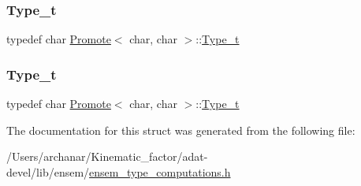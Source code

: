 \subsubsection{\texorpdfstring{Type\_t}{Type\_t}\hspace{0.1cm}{\footnotesize\ttfamily [2/3]}}
{\footnotesize\ttfamily typedef char \mbox{\hyperlink{structPromote}{Promote}}$<$ char, char $>$\+::\mbox{\hyperlink{structPromote_3_01char_00_01char_01_4_abf9ddff19f7af67343d88997bbe4d874}{Type\+\_\+t}}}

\mbox{\label{structPromote_3_01char_00_01char_01_4_abf9ddff19f7af67343d88997bbe4d874}} 
\subsubsection{\texorpdfstring{Type\_t}{Type\_t}\hspace{0.1cm}{\footnotesize\ttfamily [3/3]}}
{\footnotesize\ttfamily typedef char \mbox{\hyperlink{structPromote}{Promote}}$<$ char, char $>$\+::\mbox{\hyperlink{structPromote_3_01char_00_01char_01_4_abf9ddff19f7af67343d88997bbe4d874}{Type\+\_\+t}}}



The documentation for this struct was generated from the following file\+:\begin{DoxyCompactItemize}
\item 
/\+Users/archanar/\+Kinematic\+\_\+factor/adat-\/devel/lib/ensem/\mbox{\hyperlink{adat-devel_2lib_2ensem_2ensem__type__computations_8h}{ensem\+\_\+type\+\_\+computations.\+h}}\end{DoxyCompactItemize}
